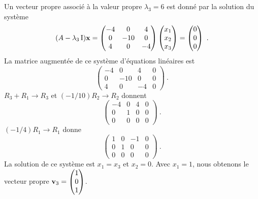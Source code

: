 {Un vecteur propre
associé à la valeur propre $\lambda_3 = 6$ est donné par la solution
du système
\[
(A-\lambda_3\operatorname{I})\mathbf{x} = 
\begin{pmatrix}
-4 & 0 & 4 \\0 & -10 & 0 \\4 & 0 & -4
\end{pmatrix}
\begin{pmatrix} x_1 \\ x_2 \\ x_3 \end{pmatrix}
= \begin{pmatrix} 0 \\ 0 \\ 0 \end{pmatrix} \ .
\]
La matrice augmentée de ce système d'équations linéaires est
\[
\left(\begin{array}{ccc|c}
-4 & 0 & 4 & 0 \\0 & -10 & 0 & 0 \\4 & 0 & -4 & 0 
\end{array}\right) \ .
\]
$R_3+R_1 \rightarrow R_3$ et $(-1/10)R_2 \rightarrow R_2$ donnent
\[
\left(\begin{array}{ccc|c}
-4 & 0 & 4 & 0 \\ 0 & 1 & 0 & 0 \\ 0 & 0 & 0 & 0
\end{array}\right) \ .
\]
$(-1/4)R_1 \rightarrow R_1$ donne
\[
\left(\begin{array}{ccc|c}
1 & 0 & -1 & 0 \\ 0 & 1 & 0 & 0 \\ 0 & 0 & 0 & 0
\end{array}\right) \ .
\]
La solution de ce système est $x_1=x_3$ et $x_2=0$.  Avec $x_1=1$,
nous obtenons le vecteur propre
$\displaystyle \mathbf{v}_3 = \begin{pmatrix} 1 \\ 0 \\ 1 \end{pmatrix}$.
}



